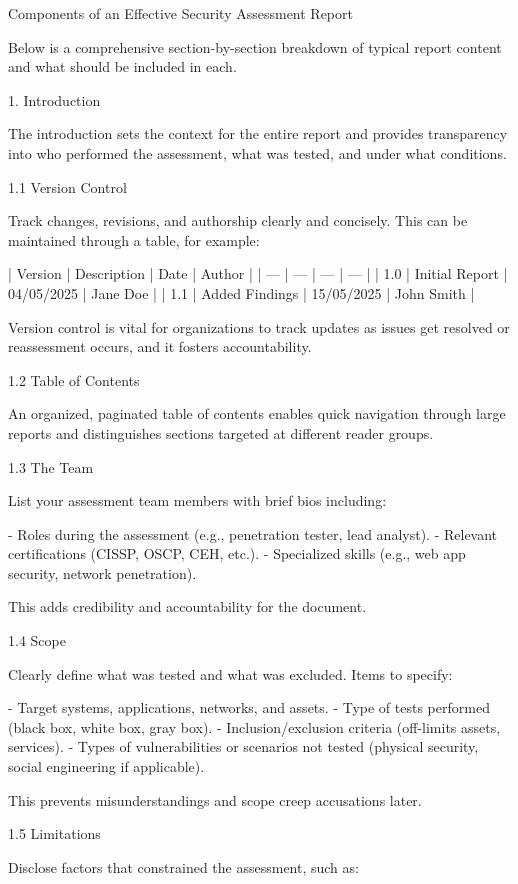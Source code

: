 Components of an Effective Security Assessment Report

Below is a comprehensive section-by-section breakdown of typical report content and what should be included in each.


1. Introduction

The introduction sets the context for the entire report and provides transparency into who performed the assessment, what was tested, and under what conditions.

1.1 Version Control

Track changes, revisions, and authorship clearly and concisely. This can be maintained through a table, for example:

| Version | Description | Date | Author |
| --- | --- | --- | --- |
| 1.0 | Initial Report | 04/05/2025 | Jane Doe |
| 1.1 | Added Findings | 15/05/2025 | John Smith |



Version control is vital for organizations to track updates as issues get resolved or reassessment occurs, and it fosters accountability.

1.2 Table of Contents

An organized, paginated table of contents enables quick navigation through large reports and distinguishes sections targeted at different reader groups.

1.3 The Team

List your assessment team members with brief bios including:

- Roles during the assessment (e.g., penetration tester, lead analyst).
- Relevant certifications (CISSP, OSCP, CEH, etc.).
- Specialized skills (e.g., web app security, network penetration).

This adds credibility and accountability for the document.

1.4 Scope

Clearly define what was tested and what was excluded. Items to specify:

- Target systems, applications, networks, and assets.
- Type of tests performed (black box, white box, gray box).
- Inclusion/exclusion criteria (off-limits assets, services).
- Types of vulnerabilities or scenarios not tested (physical security, social engineering if applicable).

This prevents misunderstandings and scope creep accusations later.

1.5 Limitations

Disclose factors that constrained the assessment, such as:

